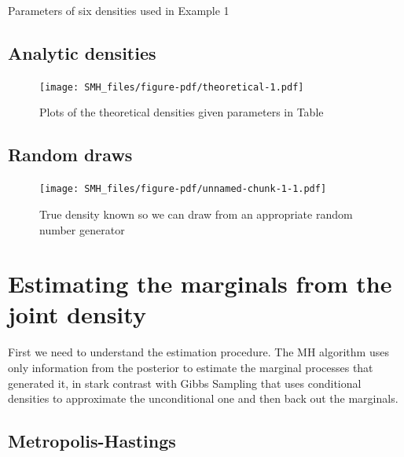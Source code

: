 \documentclass[
  letterpaper,
]{book}
\begin{document}
Parameters of six densities used in Example 1

\hypertarget{analytic-densities}{%
\subsection{Analytic densities}\label{analytic-densities}}

\begin{figure}

{\centering \texttt{[image: SMH\_files/figure-pdf/theoretical-1.pdf]}

}

\caption{Plots of the theoretical densities given parameters in Table}

\end{figure}

\hypertarget{random-draws}{%
\subsection{Random draws}\label{random-draws}}

\begin{figure}

{\centering \texttt{[image: SMH\_files/figure-pdf/unnamed-chunk-1-1.pdf]}

}

\caption{True density known so we can draw from an appropriate random
number generator}

\end{figure}

\hypertarget{estimating-the-marginals-from-the-joint-density}{%
\section{Estimating the marginals from the joint
density}\label{estimating-the-marginals-from-the-joint-density}}

First we need to understand the estimation procedure. The MH algorithm
uses only information from the posterior to estimate the marginal
processes that generated it, in stark contrast with Gibbs Sampling that
uses conditional densities to approximate the unconditional one and then
back out the marginals.

\hypertarget{metropolis-hastings-1}{%
\subsection{Metropolis-Hastings}\label{metropolis-hastings-1}}
\end{document}
